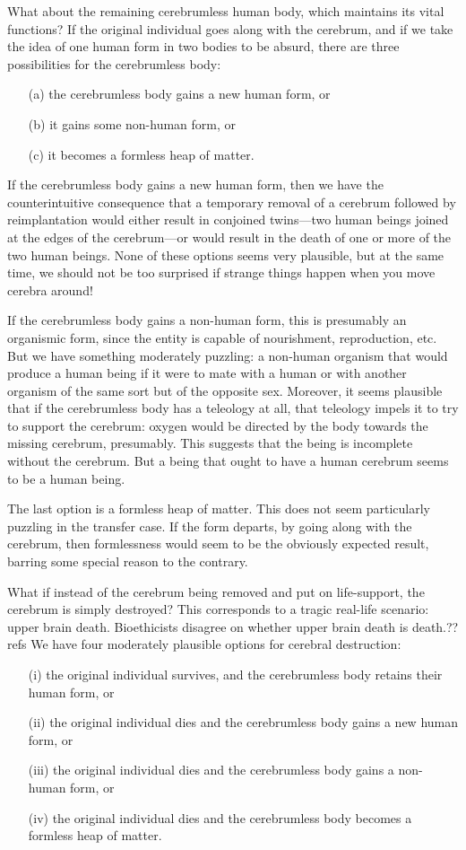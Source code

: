 What about the remaining cerebrumless human body, which maintains its vital functions? If the original individual goes along
with the cerebrum, and if we take the idea of one human form in two bodies to be absurd, there are three possibilities 
for the cerebrumless body:
\begin{itemize}
\item[(a)] the cerebrumless body gains a new human form, or 
\item[(b)] it gains some non-human form, or 
\item[(c)] it becomes a formless heap of matter. 
\end{itemize}

If the cerebrumless body gains a new human form, then we have the counterintuitive consequence that a temporary removal
of a cerebrum followed by reimplantation would either result in conjoined twins---two human beings joined at the edges
of the cerebrum---or would result in the death of one or more of the two human beings. None of these options seems very
plausible, but at the same time, we should not be too surprised if strange things happen when you move cerebra around!

If the cerebrumless body gains a non-human form, this is presumably an organismic form, since the entity is capable of
nourishment, reproduction, etc. But we have something moderately puzzling: a non-human organism
that would produce a human being if it were to mate with a human or with another organism of the same sort but of the
opposite sex. Moreover, it seems plausible that if the cerebrumless body has a teleology at all, that teleology impels
it to try to support the cerebrum: oxygen would be directed by the body towards the missing cerebrum, presumably. This
suggests that the being is incomplete without the cerebrum. But a being that ought to have a human cerebrum seems to be 
a human being. 

The last option is a formless heap of matter. This does not seem particularly puzzling in the transfer case. 
If the form departs, by going along with the cerebrum, then formlessness would seem to be the obviously expected result, 
barring some special reason to the contrary.

What if instead of the cerebrum being removed and put on life-support, the cerebrum is simply destroyed? This corresponds
to a tragic real-life scenario: upper brain death. Bioethicists disagree on whether upper brain death is death.??refs
We have four moderately plausible options for cerebral destruction:
\begin{itemize}
\item[(i)] the original individual survives, and the cerebrumless body retains their human form, or
\item[(ii)] the original individual dies and the cerebrumless body gains a new human form, or
\item[(iii)] the original individual dies and the cerebrumless body gains a non-human form, or
\item[(iv)] the original individual dies and the cerebrumless body becomes a formless heap of matter.
\end{itemize}

